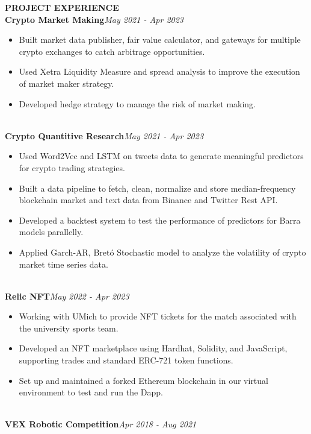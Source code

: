 \documentclass[10pt,a4paper]{article}
\begin{document}
\rlap{\rule[-1mm]{\linewidth}{.5mm}}\textbf{\large{PROJECT EXPERIENCE}}\\
\textbf{Crypto Market Making}\hfill \emph{May 2021 - Apr 2023}
\begin{itemize}[noitemsep,topsep=0pt]
    \item Built market data publisher, fair value calculator, and gateways for multiple crypto exchanges to catch arbitrage opportunities.
    \item Used Xetra Liquidity Measure and spread analysis to improve the execution of market maker strategy.
    \item Developed hedge strategy to manage the risk of market making.
\end{itemize}
\noindent\\
\textbf{Crypto Quantitive Research}\hfill \emph{May 2021 - Apr 2023}
\begin{itemize}[noitemsep,topsep=0pt]
    \item Used Word2Vec and LSTM on tweets data to generate meaningful predictors for crypto trading strategies.
    \item Built a data pipeline to fetch, clean, normalize and store median-frequency blockchain market and text data from Binance and Twitter Rest API.
    \item Developed a backtest system to test the performance of predictors for Barra models parallelly.
    \item Applied Garch-AR, Bretó Stochastic model to analyze the volatility of crypto market time series data.
\end{itemize}
\noindent\\
\textbf{Relic NFT}\hfill\emph{May 2022 - Apr 2023}
\begin{itemize}[noitemsep,topsep=0pt]
    \item Working with UMich to provide NFT tickets for the match associated with the university sports team.
    \item Developed an NFT marketplace using Hardhat, Solidity, and JavaScript, supporting trades and standard ERC-721 token functions.
    \item Set up and maintained a forked Ethereum blockchain in our virtual environment to test and run the Dapp.
\end{itemize}
\noindent\\
\textbf{VEX Robotic Competition}\hfill\emph{Apr 2018 - Aug 2021}
\end{document}
